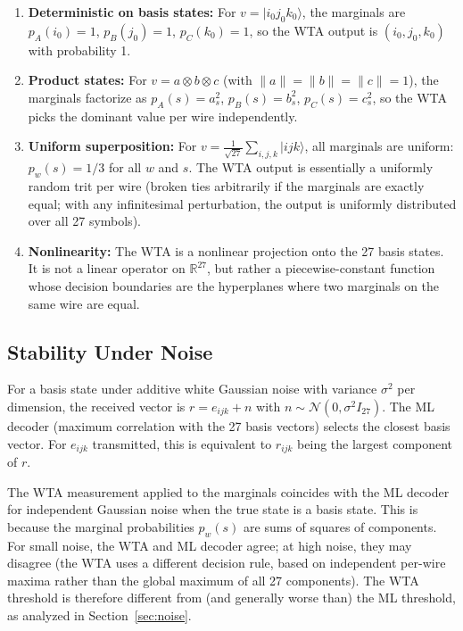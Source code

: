 \documentclass[12pt,a4paper]{article}
\begin{document}
\begin{enumerate}
\item \textbf{Deterministic on basis states:} For $v = |i_0j_0k_0\rangle$,
the marginals are $p_A(i_0)=1$, $p_B(j_0)=1$, $p_C(k_0)=1$, so the WTA
output is $(i_0,j_0,k_0)$ with probability 1.

\item \textbf{Product states:} For $v = a \otimes b \otimes c$ (with
$\|a\|=\|b\|=\|c\|=1$), the marginals factorize as $p_A(s) = a_s^2$,
$p_B(s) = b_s^2$, $p_C(s) = c_s^2$, so the WTA picks the dominant value
per wire independently.

\item \textbf{Uniform superposition:} For
$v = \frac{1}{\sqrt{27}}\sum_{i,j,k} |ijk\rangle$, all marginals are
uniform: $p_w(s) = 1/3$ for all $w$ and $s$. The WTA output is
essentially a uniformly random trit per wire (broken ties arbitrarily
if the marginals are exactly equal; with any infinitesimal perturbation,
the output is uniformly distributed over all 27 symbols).

\item \textbf{Nonlinearity:} The WTA is a nonlinear projection onto the
27 basis states. It is not a linear operator on $\mathbb{R}^{27}$, but
rather a piecewise-constant function whose decision boundaries are the
hyperplanes where two marginals on the same wire are equal.
\end{enumerate}

\subsection{Stability Under Noise}

For a basis state under additive white Gaussian noise with variance
$\sigma^2$ per dimension, the received vector is $r = e_{ijk} + n$ with
$n \sim \mathcal{N}(0, \sigma^2 I_{27})$. The ML decoder (maximum
correlation with the 27 basis vectors) selects the closest basis vector.
For $e_{ijk}$ transmitted, this is equivalent to $r_{ijk}$ being the
largest component of $r$.

The WTA measurement applied to the marginals coincides with the ML decoder
for independent Gaussian noise when the true state is a basis state.
This is because the marginal probabilities $p_w(s)$ are sums of squares
of components. For small noise, the WTA and ML decoder agree; at high
noise, they may disagree (the WTA uses a different decision rule, based
on independent per-wire maxima rather than the global maximum of all 27
components). The WTA threshold is therefore different from (and generally
worse than) the ML threshold, as analyzed in Section~\ref{sec:noise}.
\end{document}
